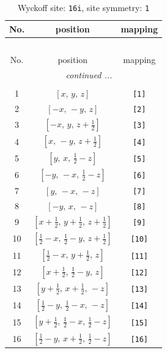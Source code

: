 \documentclass[fleqn,8pt]{jsarticle}
\begin{document}
\begin{longtable}{ccc}
\caption{Wyckoff site: {\tt 16i}, site symmetry: {\tt 1}}
 \\
 \hline \hline
No. & position & mapping \\ \hline \endfirsthead

\multicolumn{2}{l}{\tablename\ \thetable{}} \\
 \hline \hline
No. & position & mapping \\ \hline \endhead

 \hline \hline
\multicolumn{2}{r}{\footnotesize\it continued ...} \\ \endfoot

 \hline \hline
\multicolumn{2}{r}{} \\ \endlastfoot

1 & $\left[ x,\, y,\, z \right]$ & {\tt [1]} \\ \hline
2 & $\left[ - x,\, - y,\, z \right]$ & {\tt [2]} \\ \hline
3 & $\left[ - x,\, y,\, z + \frac{1}{2} \right]$ & {\tt [3]} \\ \hline
4 & $\left[ x,\, - y,\, z + \frac{1}{2} \right]$ & {\tt [4]} \\ \hline
5 & $\left[ y,\, x,\, \frac{1}{2} - z \right]$ & {\tt [5]} \\ \hline
6 & $\left[ - y,\, - x,\, \frac{1}{2} - z \right]$ & {\tt [6]} \\ \hline
7 & $\left[ y,\, - x,\, - z \right]$ & {\tt [7]} \\ \hline
8 & $\left[ - y,\, x,\, - z \right]$ & {\tt [8]} \\ \hline
9 & $\left[ x + \frac{1}{2},\, y + \frac{1}{2},\, z + \frac{1}{2} \right]$ & {\tt [9]} \\ \hline
10 & $\left[ \frac{1}{2} - x,\, \frac{1}{2} - y,\, z + \frac{1}{2} \right]$ & {\tt [10]} \\ \hline
11 & $\left[ \frac{1}{2} - x,\, y + \frac{1}{2},\, z \right]$ & {\tt [11]} \\ \hline
12 & $\left[ x + \frac{1}{2},\, \frac{1}{2} - y,\, z \right]$ & {\tt [12]} \\ \hline
13 & $\left[ y + \frac{1}{2},\, x + \frac{1}{2},\, - z \right]$ & {\tt [13]} \\ \hline
14 & $\left[ \frac{1}{2} - y,\, \frac{1}{2} - x,\, - z \right]$ & {\tt [14]} \\ \hline
15 & $\left[ y + \frac{1}{2},\, \frac{1}{2} - x,\, \frac{1}{2} - z \right]$ & {\tt [15]} \\ \hline
16 & $\left[ \frac{1}{2} - y,\, x + \frac{1}{2},\, \frac{1}{2} - z \right]$ & {\tt [16]} \\
\end{longtable}
\end{document}
